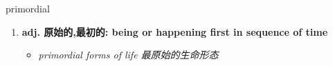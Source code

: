 
\begin{frame}
{\huge primordial}
\begin{center}
\begin{enumerate}\Large
  \item \textbf{adj. 原始的,最初的: being or happening first in sequence of time}
  \begin{itemize}
    \item \em{\Large{primordial forms of life 最原始的生命形态}}
  \end{itemize}
\end{enumerate}
\end{center}
\end{frame}

